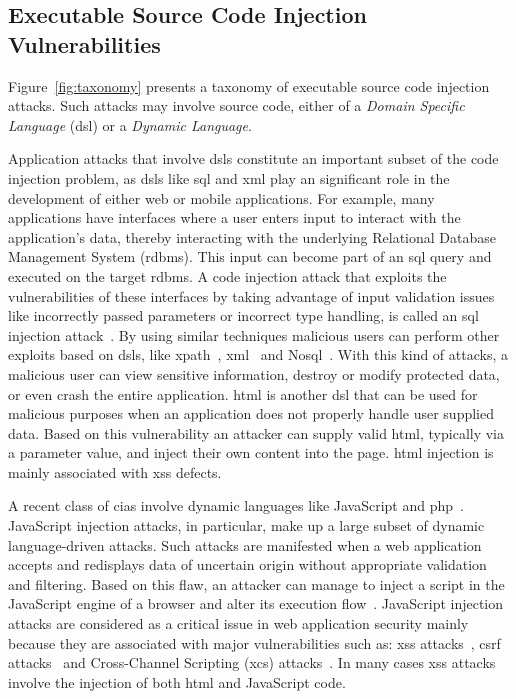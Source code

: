 \documentclass[conference]{IEEEtran}
\begin{document}
\subsection{Executable Source Code Injection Vulnerabilities}

Figure~\ref{fig:taxonomy} presents a taxonomy of executable source
code injection attacks. Such attacks may involve source code, either of a
{\it Domain Specific Language} ({\sc dsl}) or a {\it Dynamic Language}.

Application attacks that involve {\sc dsl}s constitute an important
subset of the code injection problem, as {\sc dsl}s like {\sc sql} and
{\sc xml} play an significant role in the development of either web or
mobile applications. For example, many applications have interfaces
where a user enters input to interact with the application's data,
thereby interacting with the underlying Relational Database Management
System ({\sc rdbms}). This input can become part of an {\sc sql} query
and executed on the target {\sc rdbms}. A code injection attack that
exploits the vulnerabilities of these interfaces by taking advantage
of input validation issues like incorrectly passed parameters or
incorrect type handling, is called an {\sc sql} injection
attack~\cite{CERT02,MS09,HVO06,SW06}. By using similar techniques
malicious users can perform other exploits based on {\sc dsl}s,
like {\sc xp}ath~\cite{SW06,CDL07,MKS09}, {\sc xml}~\cite{MSM13}
and No{\sc sql}~\cite{SMS13}. With this kind of attacks,
a malicious user can view sensitive information,
destroy or modify protected data, or even crash the entire
application. {\sc html} is another {\sc dsl} that can be used
for malicious purposes when an application does not properly
handle user supplied data. Based on this vulnerability
an attacker can supply valid {\sc html},
typically via a parameter value, and inject their own
content into the page. {\sc html} injection is mainly associated
with {\sc xss} defects.

A recent class of {\sc cia}s involve dynamic languages like
JavaScript and {\sc php}~\cite{SFVM09,EWKK09,SMS13}. JavaScript
injection attacks, in particular, make up a large subset of dynamic
language-driven attacks. Such attacks are manifested when a web
application accepts and redisplays data of uncertain origin without
appropriate validation and filtering. Based on this flaw, an attacker
can manage to inject a script in the JavaScript engine of a browser
and alter its execution flow~\cite{ELX07}. JavaScript injection
attacks are considered as a critical issue in web application security
mainly because they are associated with major vulnerabilities such as:
{\sc xss} attacks~\cite{SG07}, {\sc csrf} attacks~\cite{BJM08,LZRL09} and
Cross-Channel Scripting ({\sc xcs}) attacks~\cite{W10,BBB09}.
In many cases {\sc xss} attacks involve the injection of
both {\sc html} and JavaScript code.
\end{document}
